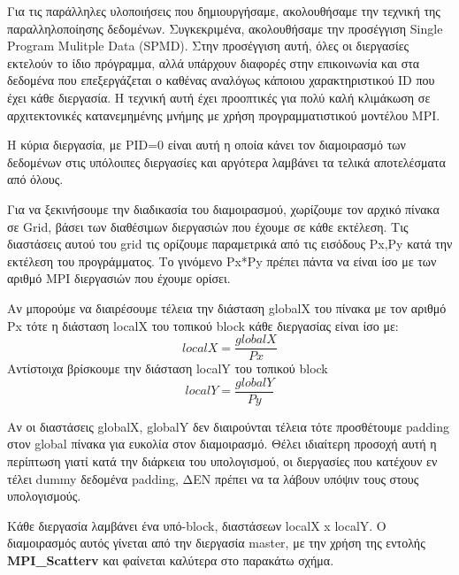 \documentclass[../final_report.tex]{subfiles}
\begin{document}
Για τις παράλληλες υλοποιήσεις που δημιουργήσαμε, ακολουθήσαμε την τεχνική της παραλληλοποίησης δεδομένων. Συγκεκριμένα, ακολουθήσαμε
την προσέγγιση Single Program Mulitple Data (SPMD). Στην προσέγγιση αυτή, όλες οι διεργασίες εκτελούν το ίδιο πρόγραμμα, αλλά υπάρχουν διαφορές
στην επικοινωνία και στα δεδομένα που επεξεργάζεται ο καθένας αναλόγως κάποιου χαρακτηριστικού ID που έχει κάθε διεργασία. Η τεχνική αυτή έχει προοπτικές
για πολύ καλή κλιμάκωση σε αρχιτεκτονικές κατανεμημένης μνήμης με χρήση προγραμματιστικού μοντέλου MPI. 

Η κύρια διεργασία, με PID=0 είναι αυτή η οποία κάνει τον διαμοιρασμό των δεδομένων στις υπόλοιπες διεργασίες και αργότερα λαμβάνει τα τελικά
αποτελέσματα από όλους.

Για να ξεκινήσουμε την διαδικασία του διαμοιρασμού, χωρίζουμε τον αρχικό πίνακα σε Grid, βάσει των διαθέσιμων διεργασιών που έχουμε σε κάθε εκτέλεση. Τις διαστάσεις
αυτού του grid τις ορίζουμε παραμετρικά από τις εισόδους Px,Py κατά την εκτέλεση του προγράμματος. Το γινόμενο Px*Py πρέπει πάντα να είναι
ίσο με των αριθμό MPI διεργασιών που έχουμε ορίσει.

Αν μπορούμε να διαιρέσουμε τέλεια την διάσταση globalX του πίνακα με τον αριθμό Px τότε η διάσταση localX του τοπικού block κάθε διεργασίας είναι ίσο με: $$  localX = \frac{globalX}{Px}$$ 
Αντίστοιχα βρίσκουμε την διάσταση localY του τοπικού block $$ localY = \frac{globalY}{Py} $$

Αν οι διαστάσεις globalX, globalY δεν διαιρούνται τέλεια τότε προσθέτουμε padding στον global πίνακα για ευκολία στον διαμοιρασμό. Θέλει ιδιαίτερη προσοχή αυτή η περίπτωση γιατί
κατά την διάρκεια του υπολογισμού, οι διεργασίες που κατέχουν εν τέλει dummy δεδομένα padding, ΔΕΝ πρέπει να τα λάβουν υπόψιν τους στους υπολογισμούς. 

Κάθε διεργασία λαμβάνει ένα υπό-block, διαστάσεων localX x localY. Ο διαμοιρασμός αυτός γίνεται από την διεργασία master, με την χρήση της εντολής \textbf{MPI\_Scatterv}
και φαίνεται καλύτερα στο παρακάτω σχήμα.
\end{document}
